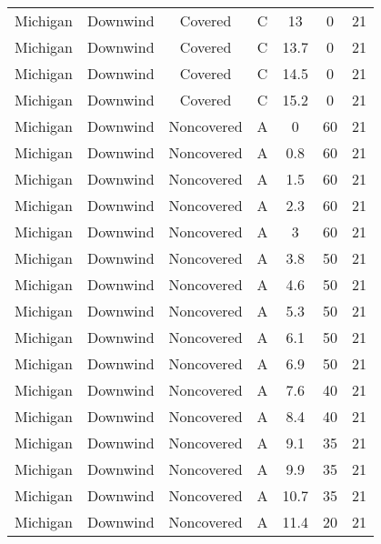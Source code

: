 \documentclass{article}
\begin{document}
\begin{longtable}[c]{ccccccc}
Michigan  & Downwind  & Covered     & C               & 13           & 0           & 21  \\
Michigan  & Downwind  & Covered     & C               & 13.7         & 0           & 21  \\
Michigan  & Downwind  & Covered     & C               & 14.5         & 0           & 21  \\
Michigan  & Downwind  & Covered     & C               & 15.2         & 0           & 21  \\
Michigan  & Downwind  & Noncovered & A               & 0            & 60          & 21  \\
Michigan  & Downwind  & Noncovered & A               & 0.8          & 60          & 21  \\
Michigan  & Downwind  & Noncovered & A               & 1.5          & 60          & 21  \\
Michigan  & Downwind  & Noncovered & A               & 2.3          & 60          & 21  \\
Michigan  & Downwind  & Noncovered & A               & 3            & 60          & 21  \\
Michigan  & Downwind  & Noncovered & A               & 3.8          & 50          & 21  \\
Michigan  & Downwind  & Noncovered & A               & 4.6          & 50          & 21  \\
Michigan  & Downwind  & Noncovered & A               & 5.3          & 50          & 21  \\
Michigan  & Downwind  & Noncovered & A               & 6.1          & 50          & 21  \\
Michigan  & Downwind  & Noncovered & A               & 6.9          & 50          & 21  \\
Michigan  & Downwind  & Noncovered & A               & 7.6          & 40          & 21  \\
Michigan  & Downwind  & Noncovered & A               & 8.4          & 40          & 21  \\
Michigan  & Downwind  & Noncovered & A               & 9.1          & 35          & 21  \\
Michigan  & Downwind  & Noncovered & A               & 9.9          & 35          & 21  \\
Michigan  & Downwind  & Noncovered & A               & 10.7         & 35          & 21  \\
Michigan  & Downwind  & Noncovered & A               & 11.4         & 20          & 21  \\

\end{longtable}
\end{document}
